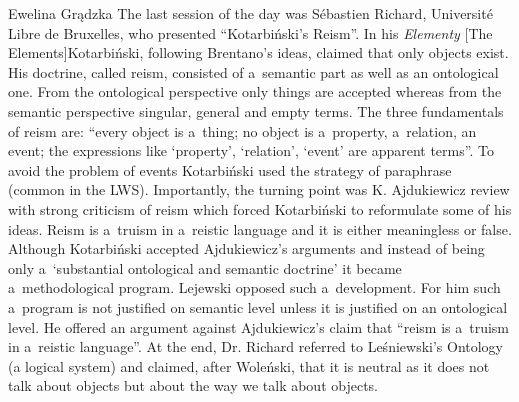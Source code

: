 \begin{editorialeng}{Ewelina Grądzka}
The last session of the day was Sébastien Richard, Université Libre de Bruxelles, who presented “Kotarbiński’s Reism”. In his \textit{Elementy} [The Elements]Kotarbiński, following Brentano’s ideas, claimed that only objects exist. His doctrine, called reism, consisted of a~semantic part as well as an ontological one. From the ontological perspective only things are accepted whereas from the semantic perspective singular, general and empty terms. The three fundamentals of reism are: “every object is a~thing; no object is a~property, a~relation, an event; the expressions like ‘property’, ‘relation’, ‘event’ are apparent terms”. To avoid the problem of events Kotarbiński used the strategy of paraphrase (common in the LWS). Importantly, the turning point was K. Ajdukiewicz review with strong criticism of reism which forced Kotarbiński to reformulate some of his ideas. Reism is a~truism in a~reistic language and it is either meaningless or false. Although Kotarbiński accepted Ajdukiewicz’s arguments and instead of being only a~‘substantial ontological and semantic doctrine’ it became a~methodological program. Lejewski opposed such a~development. For him such a~program is not justified on semantic level unless it is justified on an ontological level. He offered an argument against Ajdukiewicz’s claim that “reism is a~truism in a~reistic language”. At the end, Dr. Richard referred to Leśniewski’s Ontology (a logical system) and claimed, after Woleński, that it is neutral as it does not talk about objects but about the way we talk about objects.


\end{editorialeng}
